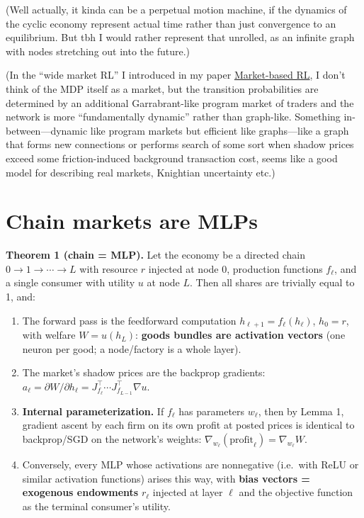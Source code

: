 (Well actually, it kinda can be a perpetual motion machine, if the dynamics of the cyclic economy represent actual time rather than just convergence to an equilibrium. But tbh I would rather represent that unrolled, as an infinite graph with nodes stretching out into the future.)

(In the ``wide market RL'' I introduced in my paper \href{https://arxiv.org/abs/2503.05828}{Market-based RL}, I don't think of the MDP itself as a market, but the transition probabilities are determined by an additional Garrabrant-like program market of traders and the network is more ``fundamentally dynamic'' rather than graph-like. Something in-between---dynamic like program markets but efficient like graphs---like a graph that forms new connections or performs search of some sort when shadow prices exceed some friction-induced background transaction cost, seems like a good model for describing real markets, Knightian uncertainty etc.)

\hypertarget{chain-markets-are-mlps}{%
\section{Chain markets are MLPs}\label{chain-markets-are-mlps}}

\textbf{Theorem 1 (chain = MLP).} Let the economy be a directed chain \(0 \to 1 \to \cdots \to L\) with resource \(r\) injected at node \(0\), production functions \(f_\ell\), and a single consumer with utility \(u\) at node \(L\). Then all shares are trivially equal to 1, and:

\begin{enumerate}
\def\labelenumi{\arabic{enumi}.}
\tightlist
\item
  The forward pass is the feedforward computation \(h_{\ell+1} = f_\ell(h_\ell)\), \(h_0 = r\), with welfare \(W = u(h_L)\): \textbf{goods bundles are activation vectors} (one neuron per good; a node/factory is a whole layer).
\item
  The market's shadow prices are the backprop gradients: \(a_\ell = \partial W / \partial h_\ell = J_{f_\ell}^\top \cdots J_{f_{L-1}}^\top \nabla u\).
\item
  \textbf{Internal parameterization.} If \(f_\ell\) has parameters \(w_\ell\), then by Lemma 1, gradient ascent by each firm on its own profit at posted prices is identical to backprop/SGD on the network's weights: \(\nabla_{w_\ell}(\text{profit}_\ell) = \nabla_{w_\ell} W\).
\item
  Conversely, every MLP whose activations are nonnegative (i.e.~with ReLU or similar activation functions) arises this way, with \textbf{bias vectors = exogenous endowments} \(r_\ell\) injected at layer \(\ell\) and the objective function as the terminal consumer's utility.
\end{enumerate}

